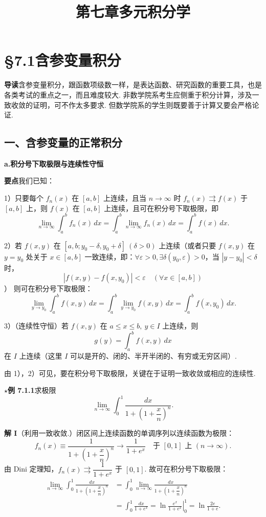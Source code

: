 \documentclass[UTF8, 12pt, fontset=fandol, oneside]{ctexart}
\title{第七章\quad 多元积分学}
\author{}
\date{}
\begin{document}
\maketitle

\section*{§7.1\quad 含参变量积分}

\noindent\textbf{导读}\quad 含参变量积分，跟函数项级数一样，是表达函数、研究函数的重要工具，也是各类考试的重点之一，而且难度较大. 非数学院系考生应侧重于积分计算，涉及一致收敛的证明，可不作太多要求. 但数学院系的学生则既要善于计算又要会严格论证.

\subsection*{一、含参变量的正常积分}

\noindent\textbf{a.\quad 积分号下取极限与连续性守恒}

\noindent\textbf{要点}\quad 我们已知：

1）只要每个 $f_n(x)$ 在 $[a,b]$ 上连续，且当 $n\to\infty$ 时 $f_n(x)\rightrightarrows f(x)$ 于 $[a,b]$ 上，则 $f(x)$ 在 $[a,b]$ 上连续，且可在积分号下取极限，即
\[
\lim_{n\to\infty}\int_a^b f_n(x)\,dx
=\int_a^b \lim_{n\to\infty}f_n(x)\,dx
=\int_a^b f(x)\,dx.
\]

2）若 $f(x,y)$ 在 $[a,b;y_0-\delta,y_0+\delta]\ (\delta>0)$ 上连续（或者只要 $f(x,y)$ 在 $y=y_0$ 处关于 $x\in[a,b]$ 一致连续，即：$\forall\varepsilon>0,\exists\delta(y_0,\varepsilon)>0$，当 $|y-y_0|<\delta$ 时，
\[
|f(x,y)-f(x,y_0)|<\varepsilon\quad(\forall x\in[a,b])
\]
）
则可在积分号下取极限：
\[
\lim_{y\to y_0}\int_a^b f(x,y)\,dx
=\int_a^b \lim_{y\to y_0}f(x,y)\,dx
=\int_a^b f(x,y_0)\,dx.
\]

3）（连续性守恒）若 $f(x,y)$ 在 $a\le x\le b,\ y\in I$ 上连续，则
\[
g(y)=\int_a^b f(x,y)\,dx
\]
在 $I$ 上连续（这里 $I$ 可以是开的、闭的、半开半闭的、有穷或无穷区间）.

由 1），2）可见，要在积分号下取极限，关键在于证明一致收敛或相应的连续性.

\noindent\textbf{$\star$例 7.1.1}\quad 求极限
\[
\lim_{n\to\infty}\int_0^1\frac{dx}{1+\left(1+\dfrac{x}{n}\right)^n}.
\]

\noindent\textbf{解 I}\quad （利用一致收敛.）闭区间上连续函数的单调序列以连续函数为极限：
\[
f_n(x)\equiv \frac1{1+\left(1+\dfrac{x}{n}\right)^n}
\to \frac1{1+e^x}\quad\text{于 }[0,1]\text{ 上 }(n\to\infty).
\]
由 Dini 定理知，$f_n(x)\rightrightarrows\dfrac1{1+e^x}$ 于 $[0,1]$. 故可在积分号下取极限：
\[
\begin{aligned}
\lim_{n\to\infty}\int_0^1\frac{dx}{1+\left(1+\dfrac{x}{n}\right)^n}
&=\int_0^1\lim_{n\to\infty}\frac{dx}{1+\left(1+\dfrac{x}{n}\right)^n}\\
&=\int_0^1\frac{dx}{1+e^x}
=\left.\ln\frac{e^x}{1+e^x}\right|_0^1
=\ln\frac{2e}{1+e}.
\end{aligned}
\]
\end{document}
